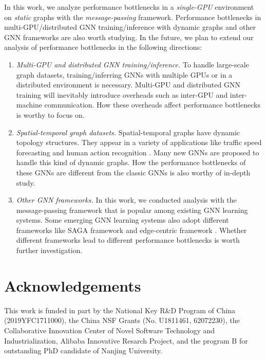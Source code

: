 In this work, we analyze performance bottlenecks in a \emph{single-GPU} environment on \emph{static} graphs with the \emph{message-passing} framework.
%
Performance bottlenecks in multi-GPU/distributed GNN training/inference with dynamic graphs and other GNN frameworks are also worth studying.
%
In the future, we plan to extend our analysis of performance bottlenecks in the following directions:
%
\begin{enumerate}
    \item \emph{Multi-GPU and distributed GNN training/inference.}
    To handle large-scale graph datasets, training/inferring GNNs with multiple GPUs or in a distributed environment is necessary.
    Multi-GPU and distributed GNN training will inevitably introduce overheads such as inter-GPU and inter-machine communication. 
    How these overheads affect performance bottlenecks is worthy to focus on.
    \item \emph{Spatial-temporal graph datasets.}
    Spatial-temporal graphs have dynamic topology structures.
    They appear in a variety of applications like traffic speed forecasting \cite{li2018_DCRNN} and human action recognition \cite{yan2018_STGCN}.
    Many new GNNs are proposed to handle this kind of dynamic graphs.
    How the performance bottlenecks of these GNNs are different from the classic GNNs is also worthy of in-depth study.
    \item \emph{Other GNN frameworks.}
    In this work, we conducted analysis with the message-passing framework that is popular among existing GNN learning systems.
    Some emerging GNN learning systems also adopt different frameworks like SAGA framework \cite{ma2019_neugraph} and edge-centric framework \cite{he2019_EnGN}.
    Whether different frameworks lead to different performance bottlenecks is worth further investigation.
\end{enumerate}

\section*{Acknowledgements}

This work is funded in part by the National Key R\&D Program of China (2019YFC1711000), the China NSF Grants (No. U1811461, 62072230), the Collaborative Innovation Center of Novel Software Technology and Industrialization, Alibaba Innovative Resarch Project, and the program B for outstanding PhD candidate of Nanjing University.

